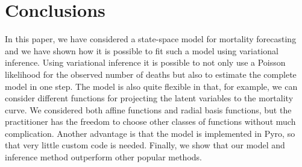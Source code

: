 \documentclass[11pt]{article}
\begin{document}
\section{Conclusions}\label{sec:conclusions}

In this paper, we have considered a state-space model for mortality forecasting and we have shown how it is possible to fit such a model using variational inference. Using variational inference it is possible to not only use a Poisson likelihood for the observed number of deaths but also to estimate the complete model in one step. The model is also quite flexible in that, for example, we can consider different functions for projecting the latent variables to the mortality curve. We considered both affine functions and radial basis functions, but the practitioner has the freedom to choose other classes of functions without much complication. Another advantage is that the model is implemented in Pyro, so that very little custom code is needed. Finally, we show that our model and inference method outperform other popular methods.
    
    


\end{document}
